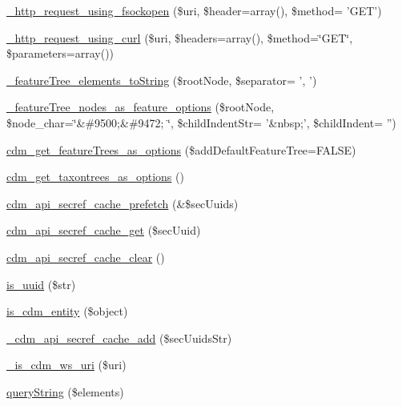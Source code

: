 \begin{DoxyCompactItemize}
\item 
\hyperlink{cdm__api_8module_ae0afff43ac1526a84a4f8bc185f6a07f}{\-\_\-http\-\_\-request\-\_\-using\-\_\-fsockopen} (\$uri, \$header=array(), \$method= 'G\-E\-T')
\item 
\hyperlink{cdm__api_8module_a86c725aceec2eb8b7ed186c8789d1adc}{\-\_\-http\-\_\-request\-\_\-using\-\_\-curl} (\$uri, \$headers=array(), \$method=\char`\"{}G\-E\-T\char`\"{}, \$parameters=array())
\item 
\hyperlink{cdm__api_8module_a7cda537bd732662c2f0a42738cd55358}{\-\_\-feature\-Tree\-\_\-elements\-\_\-to\-String} (\$root\-Node, \$separator= ', ')
\item 
\hyperlink{cdm__api_8module_a66ec5326151d5b2bf368a1d34db8d025}{\-\_\-feature\-Tree\-\_\-nodes\-\_\-as\-\_\-feature\-\_\-options} (\$root\-Node, \$node\-\_\-char=\char`\"{}\&\#9500;\&\#9472; \char`\"{}, \$child\-Indent\-Str= '\&nbsp;', \$child\-Indent= '')
\item 
\hyperlink{cdm__api_8module_a5092ee24ab6064e21dde39e7ea2b8e01}{cdm\-\_\-get\-\_\-feature\-Trees\-\_\-as\-\_\-options} (\$add\-Default\-Feature\-Tree=F\-A\-L\-S\-E)
\item 
\hyperlink{cdm__api_8module_a44cbb0542b1f61e33594ac318be14e01}{cdm\-\_\-get\-\_\-taxontrees\-\_\-as\-\_\-options} ()
\item 
\hyperlink{cdm__api_8module_a797194aae21ef24760dd54ff57f54be1}{cdm\-\_\-api\-\_\-secref\-\_\-cache\-\_\-prefetch} (\&\$sec\-Uuids)
\item 
\hyperlink{cdm__api_8module_a15a3877a0af368f5ed7bdb62b77ade07}{cdm\-\_\-api\-\_\-secref\-\_\-cache\-\_\-get} (\$sec\-Uuid)
\item 
\hyperlink{cdm__api_8module_a563ea5dee541ebc54733e17786adf9d4}{cdm\-\_\-api\-\_\-secref\-\_\-cache\-\_\-clear} ()
\item 
\hyperlink{cdm__api_8module_a6dcde545b41f0f8c587fcbba53939a58}{is\-\_\-uuid} (\$str)
\item 
\hyperlink{cdm__api_8module_a886922b490956c311457eb9f0b3fd730}{is\-\_\-cdm\-\_\-entity} (\$object)
\item 
\hyperlink{cdm__api_8module_aaa22924ab4b153e48bb0dd7e43e4a5e1}{\-\_\-cdm\-\_\-api\-\_\-secref\-\_\-cache\-\_\-add} (\$sec\-Uuids\-Str)
\item 
\hyperlink{cdm__api_8module_a0e980e4af0d47cf6e72ad4e13dc49d73}{\-\_\-is\-\_\-cdm\-\_\-ws\-\_\-uri} (\$uri)
\item 
\hyperlink{cdm__api_8module_ad410b2e72f308384c4f83ae99abe410e}{query\-String} (\$elements)
\item 

\end{DoxyCompactItemize}
